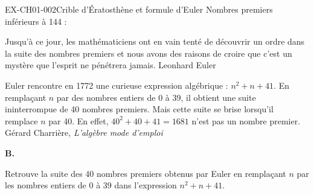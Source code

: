 \documentclass[12pt, a4paper]{article}
\begin{document}
\begin{exercice}{EX-CH01-002}{Crible d'Ératosthène et formule d'Euler}
\vspace{20pt}
Nombres premiers inférieurs à 144 : 

\vspace{20pt}
{\footnotesize \og Jusqu'à ce jour, les mathématiciens ont en vain tenté de découvrir un ordre dans la suite des nombres premiers et nous avons des raisons de croire que c'est un mystère que l'esprit ne pénétrera jamais. \fg \hfill Leonhard Euler}

\medskip
{\footnotesize \og Euler rencontre en 1772 une curieuse expression algébrique : $n^2 + n + 41$. En remplaçant $n$ par des nombres entiers de 0 à 39, il obtient une suite ininterrompue de 40 nombres premiers. Mais cette suite se brise lorsqu'il remplace $n$ par 40. En effet, $40^2 + 40 + 41 = 1681$ n'est pas un nombre premier. \fg \hfill Gérard Charrière, \textit{L'algèbre mode d'emploi}}

\newpage
\textbf{B.}

\medskip
Retrouve la suite des 40 nombres premiers obtenus par Euler en remplaçant $n$ par les nombres entiers de 0 à 39 dans l'expression $n^2 + n + 41$.


\end{exercice}
\end{document}
